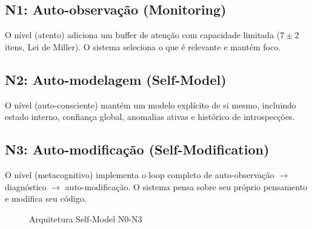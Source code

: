 \subsection{N1: Auto-observação (Monitoring)}

\begin{definicao}[Nível N1]
O nível  (atento) adiciona um buffer de atenção com
capacidade limitada ($7 \pm 2$ itens, Lei de Miller). O sistema
seleciona o que é relevante e mantém foco.
\end{definicao}

\subsection{N2: Auto-modelagem (Self-Model)}

\begin{definicao}[Nível N2]
O nível  (auto-consciente) mantém um modelo explícito de
si mesmo, incluindo estado interno, confiança global, anomalias ativas
e histórico de introspecções.
\end{definicao}

\subsection{N3: Auto-modificação (Self-Modification)}

\begin{definicao}[Nível N3]
O nível  (metacognitivo) implementa o loop completo de
auto-observação $\to$ diagnóstico $\to$ auto-modificação. O sistema
pensa sobre seu próprio pensamento e modifica seu código.
\end{definicao}

\begin{figure}[htb]
\centering
\caption{Arquitetura Self-Model N0-N3}
\label{fig:self-model-arch}
\end{figure}

